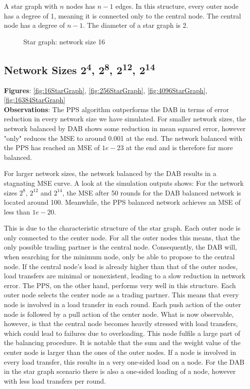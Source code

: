 A star graph with $n$ nodes has $n-1$ edges. In this structure, every outer node has a degree of 1, meaning it is connected only to the central node. The central node has a degree of $n-1$. The diameter of a star graph is 2.
\begin{figure}[H]
    \centering
    
    \caption{Star graph: network size 16}
    \label{fig:stargraphDemo}
\end{figure}
\subsection{Network Sizes 2\textsuperscript{4}, 2\textsuperscript{8}, 2\textsuperscript{12}, 2\textsuperscript{14}}
\textbf{Figures}: \ref{fig:16StarGraph}, \ref{fig:256StarGraph}, \ref{fig:4096StarGraph}, \ref{fig:16384StarGraph}\\
\textbf{Observations}: The PPS algorithm outperforms the DAB in terms of error reduction in every network size we have simulated. For smaller network sizes, the network balanced by DAB shows some reduction in mean squared error, however "only" reduces the MSE to around 0.001 at the end. The network balanced with the PPS has reached an MSE of $1e-23$ at the end and is therefore far more balanced.

For larger network sizes, the network balanced by the DAB results in a stagnating MSE curve. A look at the simulation outputs shows: For the network sizes $2^{8}$, $2^{12}$ and $2^{14}$, the MSE after 50 rounds for the DAB balanced network is located around 100. Meanwhile, the PPS balanced network achieves an MSE of less than $1e-20$.

This is due to the characteristic structure of the star graph. Each outer node is only connected to the center node. For all the outer nodes this means, that the only possible trading partner is the central node. Consequently, the DAB will, when searching for the minimum node, only be able to propose to the central node. If the central node's load is already higher than that of the outer nodes, load transfers are minimal or nonexistent, leading to a slow reduction in network error. The PPS, on the other hand, performs very well in this structure. Each outer node selects the center node as a trading partner. This means that every node is involved in a load transfer in each round. Each push action of the outer node is followed by a pull action of the center node. What is now observable, however, is that the central node becomes heavily stressed with load transfers, which could lead to failures due to overloading. This node fulfils a large part of the balancing procedure. It is notable that the sum and the weight value of the center node is larger than the ones of the outer nodes. If a node is involved in every load transfer, this results in a very one-sided load on a node. For the DAB in the star graph scenario there is also a one-sided loading of a node, however with less load transfers per round.

